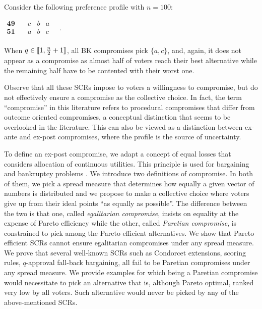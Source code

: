 \begin{example}
	\label{ex:ex2}
	Consider the following preference profile with $n=100$:
	\begin{center}
		$
		\begin{array}{cccc}
			\mathbf{49} \quad &c&b&a\\
			\mathbf{51} \quad &a&b&c\\
		\end{array} \quad.
		$
	\end{center}
	When $q\in \llbracket1,\frac{n}{2}+1\rrbracket $, all \acs{BK} compromises pick $\{a,c\}$, and, again, it does not appear as a compromise as almost half of voters reach their best alternative while the remaining half have to be contented with their worst one.
\end{example}

Observe that all these \acp{SCR} impose to voters a willingness to compromise, but do not effectively ensure a compromise as the collective choice. In fact, the term “compromise” in this literature refers to procedural compromises that differ from outcome oriented compromises, a conceptual distinction that seems to be overlooked in the literature.
This can also be viewed as a distinction between ex-ante and ex-post compromises, where the profile is the source of uncertainty.

To define an ex-post compromise, we adapt a concept of equal losses that considers allocation of continuous utilities. This principle is used for bargaining \citep{Chun1988, Chun1991} and bankruptcy problems \citep{Herrero2001}. 
We introduce two definitions of compromise. In both of them, we pick a spread measure that determines how equally a given vector of numbers is distributed and we propose to make a collective choice where voters give up from their ideal points “as equally as possible”. The difference between the two is that one, called \emph{egalitarian compromise}, insists on equality at the expense of Pareto efficiency while the other, called \emph{Paretian compromise}, is constrained to pick among the Pareto efficient alternatives. We show that Pareto efficient \acp{SCR} cannot ensure egalitarian compromises under any spread measure. We prove that several well-known \acp{SCR} such as Condorcet extensions, scoring rules, $q$-approval fall-back bargaining, all fail to be Paretian compromises under any spread measure. We provide examples for which being a Paretian compromise would necessitate to pick an alternative that is, although Pareto optimal, ranked very low by all voters. Such alternative would never be picked by any of the above-mentioned \acp{SCR}. 

